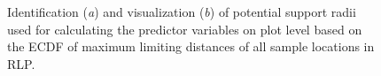\begin{figure}[h]
	\begin{subfigure}[t]{0.5\textwidth}
		\centering
		\caption{} \label{fig:sf1}
	\end{subfigure}
	\begin{subfigure}[t]{0.5\textwidth}
		\centering
		\caption{} \label{fig:sf2}
	\end{subfigure}
     \caption{Identification (\textit{a}) and visualization (\textit{b}) of potential support radii used for calculating the predictor variables on plot level based on the ECDF of maximum limiting distances of all \bwi{} sample locations in RLP.}
      \label{fig:tspec_supps}
\end{figure}

